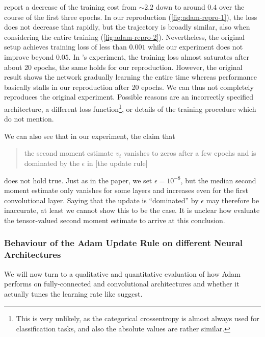 \citeauthor{kingma2014adam} report a decrease of the training cost from $\sim
2.2$ down to around $0.4$ over the course of the first three epochs. In our
reproduction (\cref{fig:adam-repro-1}), the loss does not decrease that rapidly,
but the trajectory is broadly similar, also when considering the entire training
(\cref{fig:adam-repro-2}). Nevertheless, the original setup achieves training
loss of less than $0.001$ while our experiment does not improve beyond $0.05$.
In \citeauthor{kingma2014adam}'s experiment, the training loss almost saturates
after about 20 epochs, the same holds for our reproduction. However, the
original result shows the network gradually learning the entire time whereas
performance basically stalls in our reproduction after 20 epochs. We can thus
not completely reproduces the original experiment.  Possible reasons are an
incorrectly specified architecture, a different loss function\footnote{This is
    very unlikely, as the categorical crossentropy is almost always used for
classification tasks, and also the absolute values are rather similar.}, or
details of the training procedure which \citeauthor{kingma2014adam} do not
mention.

We can also see that in our experiment, the claim that
\begin{quote}
 the second moment estimate $v_t$ vanishes to zeros after a few epochs and is
 dominated by the $\epsilon$ in [the update rule]
\end{quote}
does not hold true. Just as in the paper, we set $\epsilon = 10^{-8}$, but the
median second moment estimate only vanishes for some layers and increases even
for the first convolutional layer. Saying that the update is ``dominated'' by
$\epsilon$ may therefore be inaccurate, at least we cannot show this to be the
case. It is unclear how \citeauthor{kingma2014adam} evaluate the tensor-valued
second moment estimate to arrive at this conclusion.

\subsubsection{Behaviour of the Adam Update Rule on different Neural
Architectures}
\label{subsec:adam-behaviour}

We will now turn to a qualitative and quantitative evaluation of how Adam
performs on fully-connected and convolutional architectures and whether it
actually tunes the learning rate like \citet{kingma2014adam} suggest.


